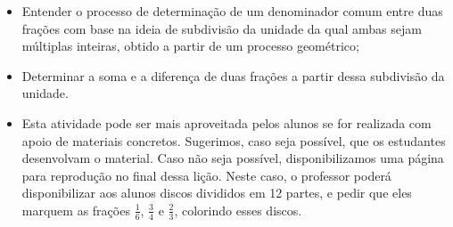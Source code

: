 \begin{multicols}{2}
\begin{objetivos}[label=chap5-ativ4]{}{}

\begin{itemize} %
  \item      Entender o processo de determinação de um denominador comum entre duas frações com base na ideia de subdivisão da unidade da qual ambas sejam múltiplas inteiras, obtido a partir de um processo geométrico;
  \item      Determinar a soma e a diferença de duas frações a partir dessa subdivisão da unidade.
\end{itemize} %
\end{objetivos}

\begin{orientacoes}{}{}

\begin{itemize} %
  \item      Esta atividade pode ser mais aproveitada pelos alunos se for realizada com apoio de materiais concretos. Sugerimos, caso seja possível, que os estudantes desenvolvam o material. Caso não seja possível, disponibilizamos uma página para reprodução no final dessa lição. Neste caso, o professor poderá disponibilizar aos alunos discos divididos em 12 partes, e pedir que eles marquem as frações     $\frac{1}{6}$,     $\frac{3}{4}$     e     $\frac{2}{3}$,     colorindo esses discos.



\end{itemize}
\end{orientacoes}
\end{multicols}
